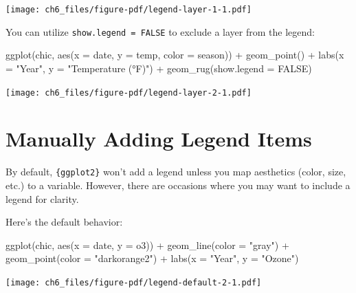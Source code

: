 \documentclass[
  letterpaper,
]{scrbook}
\newenvironment{Shaded}{\begin{snugshade}}{\end{snugshade}}
\newcommand{\AttributeTok}[1]{\textcolor[rgb]{0.40,0.45,0.13}{#1}}
\newcommand{\ConstantTok}[1]{\textcolor[rgb]{0.56,0.35,0.01}{#1}}
\newcommand{\FunctionTok}[1]{\textcolor[rgb]{0.28,0.35,0.67}{#1}}
\newcommand{\NormalTok}[1]{\textcolor[rgb]{0.00,0.23,0.31}{#1}}
\newcommand{\SpecialCharTok}[1]{\textcolor[rgb]{0.37,0.37,0.37}{#1}}
\newcommand{\StringTok}[1]{\textcolor[rgb]{0.13,0.47,0.30}{#1}}
\begin{document}
\texttt{[image: ch6\_files/figure-pdf/legend-layer-1-1.pdf]}

You can utilize \texttt{show.legend\ =\ FALSE} to exclude a layer from
the legend:

\begin{Shaded}
\begin{Highlighting}[]
\FunctionTok{ggplot}\NormalTok{(chic, }\FunctionTok{aes}\NormalTok{(}\AttributeTok{x =}\NormalTok{ date, }\AttributeTok{y =}\NormalTok{ temp, }\AttributeTok{color =}\NormalTok{ season)) }\SpecialCharTok{+}
  \FunctionTok{geom\_point}\NormalTok{() }\SpecialCharTok{+}
  \FunctionTok{labs}\NormalTok{(}\AttributeTok{x =} \StringTok{"Year"}\NormalTok{, }\AttributeTok{y =} \StringTok{"Temperature (°F)"}\NormalTok{) }\SpecialCharTok{+}
  \FunctionTok{geom\_rug}\NormalTok{(}\AttributeTok{show.legend =} \ConstantTok{FALSE}\NormalTok{)}
\end{Highlighting}
\end{Shaded}

\texttt{[image: ch6\_files/figure-pdf/legend-layer-2-1.pdf]}

\section{Manually Adding Legend
Items}\label{manually-adding-legend-items}

By default, \texttt{\{ggplot2\}} won't add a legend unless you map
aesthetics (color, size, etc.) to a variable. However, there are
occasions where you may want to include a legend for clarity.

Here's the default behavior:

\begin{Shaded}
\begin{Highlighting}[]
\FunctionTok{ggplot}\NormalTok{(chic, }\FunctionTok{aes}\NormalTok{(}\AttributeTok{x =}\NormalTok{ date, }\AttributeTok{y =}\NormalTok{ o3)) }\SpecialCharTok{+}
  \FunctionTok{geom\_line}\NormalTok{(}\AttributeTok{color =} \StringTok{"gray"}\NormalTok{) }\SpecialCharTok{+}
  \FunctionTok{geom\_point}\NormalTok{(}\AttributeTok{color =} \StringTok{"darkorange2"}\NormalTok{) }\SpecialCharTok{+}
  \FunctionTok{labs}\NormalTok{(}\AttributeTok{x =} \StringTok{"Year"}\NormalTok{, }\AttributeTok{y =} \StringTok{"Ozone"}\NormalTok{)}
\end{Highlighting}
\end{Shaded}

\texttt{[image: ch6\_files/figure-pdf/legend-default-2-1.pdf]}
\end{document}
